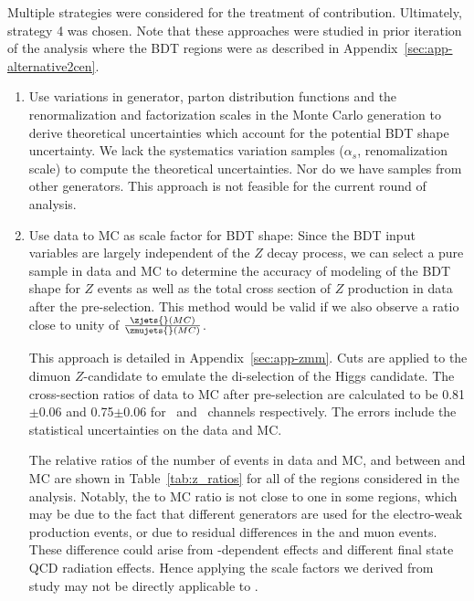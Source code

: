 Multiple strategies were considered for the treatment of \zjets{} contribution. Ultimately, strategy 4 was chosen. Note that these approaches were studied in prior iteration of the analysis where the BDT regions were as described in Appendix~\ref{sec:app-alternative2cen}.

\begin{enumerate}

\item Use variations in generator, parton distribution functions and the renormalization and factorization scales in the \zjets{} Monte Carlo generation to derive theoretical uncertainties which account for the potential BDT shape uncertainty. We lack the systematics variation samples ($\alpha_s$, renomalization scale) to compute the theoretical uncertainties. Nor do we have \zjets{} samples from other generators. This approach is not feasible for the current round of analysis. 

\item Use data to MC \zmujets{} as scale factor for \zjets{} BDT shape: Since the BDT input variables are largely independent of the $Z$ decay process, we can select a pure \zmujets{} sample in data and MC to determine the accuracy of modeling of the BDT shape for $Z$ events as well as the total cross section of $Z$ production in data after the pre-selection. This method would be valid if we also observe a ratio close to unity of $\frac{\zjets{}(MC)}{\zmujets{}(MC)}$.  

This approach is detailed in Appendix~\ref{sec:app-zmm}.  Cuts are applied to the dimuon $Z$-candidate to emulate the di-\bjet selection of the Higgs candidate. The cross-section ratios of data to MC after pre-selection are calculated to be 0.81$\pm$0.06 and 0.75$\pm$0.06 for \twocentral~and \fourcentral~channels respectively. The errors include the statistical uncertainties on the data and MC. 

The relative ratios of the number of events in data and MC, and between \zjets{} and \zmujets{} MC are shown in Table~\ref{tab:z_ratios} for all of the regions considered in the analysis. Notably, the \zmujets{} to \zjets{} MC ratio is not close to one in some regions, which may be due to the fact that different generators are used for the electro-weak production events, or due to residual differences in the \bjet{} and muon events.  These difference could arise from \pT-dependent \btagging effects and different final state QCD radiation effects. Hence applying the scale factors we derived from \zmujets{} study may not be directly applicable to \zjets{}. 


\end{enumerate}
